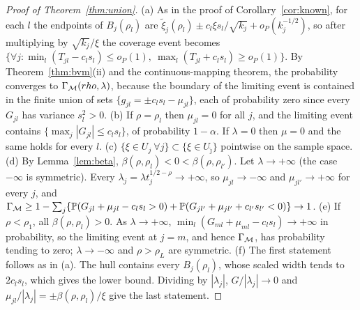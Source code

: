\begin{proof}[Proof of Theorem~\ref{thm:union}]
(a) As in the proof of Corollary~\ref{cor:known}, for each $l$ the endpoints of $B_j(\rho_l)$ are
$\tilde\xi_j(\rho_l)\pm c_l\xi s_l/\sqrt{k_j}+o_P(k_j^{-1/2})$, so after multiplying by
$\sqrt{k_j}/\xi$ the coverage event becomes
$\{\forall j:\min_l(T_{jl}-c_ls_l)\le o_P(1),\ \max_l(T_{jl}+c_ls_l)\ge o_P(1)\}$. By
Theorem~\ref{thm:bvm}(ii) and the continuous-mapping theorem, the probability converges to
$\Gamma_{\mathcal{M}}(rho,\lambda)$, because the boundary of the limiting event is contained in the
finite union of sets $\{g_{jl}=\pm c_ls_l-\mu_{jl}\}$, each of probability zero since every $G_{jl}$
has variance $s_l^2>0$.
(b) If $\rho=\rho_l$ then $\mu_{jl}=0$ for all $j$, and the limiting event contains
$\{\max_j|G_{jl}|\le c_ls_l\}$, of probability $1-\alpha$. If $\lambda=0$ then $\mu=0$ and the same
holds for every $l$.
(c) $\{\xi\in U_j\ \forall j\}\subset\{\xi\in U_{\hat\jmath}\}$ pointwise on the sample space.
(d) By Lemma~\ref{lem:beta}, $\beta(\rho,\rho_l)<0<\beta(\rho,\rho_{l'})$. Let $\lambda\to+\infty$
(the case $-\infty$ is symmetric). Every $\lambda_j=\lambda t_j^{1/2-\rho}\to+\infty$, so
$\mu_{jl}\to-\infty$ and $\mu_{jl'}\to+\infty$ for every $j$, and
$\Gamma_{\mathcal{M}}\ge1-\sum_j\{\mathbb{P}(G_{jl}+\mu_{jl}-c_ls_l>0)+\mathbb{P}(G_{jl'}+\mu_{jl'}+c_{l'}s_{l'}<0)\}\to1$.
(e) If $\rho<\rho_1$, all $\beta(\rho,\rho_l)>0$. As $\lambda\to+\infty$,
$\min_l(G_{ml}+\mu_{ml}-c_ls_l)\to+\infty$ in probability, so the limiting event at $j=m$, and
hence $\Gamma_{\mathcal{M}}$, has probability tending to zero; $\lambda\to-\infty$ and $\rho>\rho_L$ are
symmetric.
(f) The first statement follows as in (a). The hull contains every $B_j(\rho_l)$, whose scaled
width tends to $2c_ls_l$, which gives the lower bound. Dividing by $|\lambda_j|$, $G/|\lambda_j|\to0$
and $\mu_{jl}/|\lambda_j|=\pm\beta(\rho,\rho_l)/\xi$ give the last statement. \qedhere
\end{proof}

